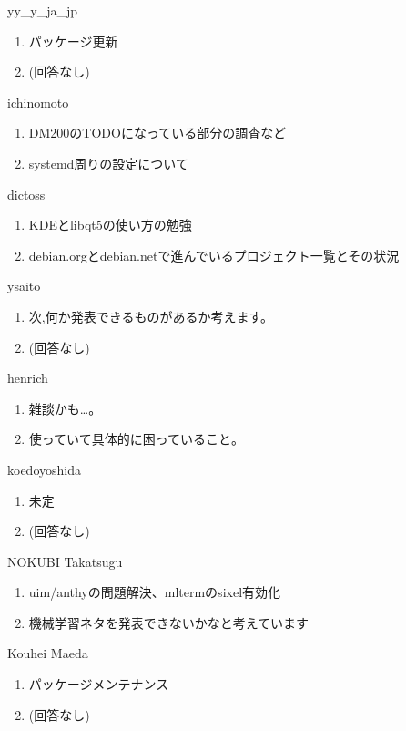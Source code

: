 %
%
\begin{prework}{ yy\_y\_ja\_jp }
  \begin{enumerate}
  \item パッケージ更新
  \item (回答なし)
  \end{enumerate}
\end{prework}

\begin{prework}{ ichinomoto }
  \begin{enumerate}
  \item DM200のTODOになっている部分の調査など
  \item systemd周りの設定について
  \end{enumerate}
\end{prework}

\begin{prework}{ dictoss }
  \begin{enumerate}
  \item KDEとlibqt5の使い方の勉強
  \item debian.orgとdebian.netで進んでいるプロジェクト一覧とその状況
  \end{enumerate}
\end{prework}

\begin{prework}{ ysaito }
  \begin{enumerate}
  \item 次,何か発表できるものがあるか考えます。
  \item (回答なし)
  \end{enumerate}
\end{prework}

\begin{prework}{ henrich }
  \begin{enumerate}
  \item 雑談かも…。
  \item 使っていて具体的に困っていること。
  \end{enumerate}
\end{prework}

\begin{prework}{ koedoyoshida }
  \begin{enumerate}
  \item 未定
  \item (回答なし)
  \end{enumerate}
\end{prework}

\begin{prework}{ NOKUBI Takatsugu }
  \begin{enumerate}
  \item uim/anthyの問題解決、mltermのsixel有効化
  \item 機械学習ネタを発表できないかなと考えています
  \end{enumerate}
\end{prework}

\begin{prework}{ Kouhei Maeda }
  \begin{enumerate}
  \item パッケージメンテナンス
  \item (回答なし)
  \end{enumerate}
\end{prework}
